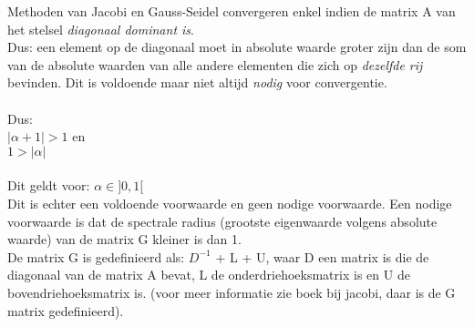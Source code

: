 Methoden van Jacobi en Gauss-Seidel convergeren enkel indien de matrix A van het stelsel \textit{diagonaal dominant is}.\\
Dus: een element op de diagonaal moet in absolute waarde groter zijn dan de som van de absolute waarden van alle andere elementen die zich op \textit{dezelfde rij} bevinden. Dit is voldoende maar niet altijd \textit{nodig} voor convergentie.\\\\
Dus:\\
$|\alpha+1| > 1$ en\\
$1 > |\alpha|$\\\\
Dit geldt voor:
$\alpha \in ]0,1[$\\

Dit is echter een voldoende voorwaarde en geen nodige voorwaarde.
Een nodige voorwaarde is dat de spectrale radius
(grootste eigenwaarde volgens absolute waarde) van de matrix G kleiner is dan 1.\\
De matrix G is gedefinieerd als: $D^{-1}$ + L + U, waar D een matrix is die de diagonaal van de matrix A bevat, L de onderdriehoeksmatrix is en U de bovendriehoeksmatrix is. (voor meer informatie zie boek bij jacobi, daar is de G matrix gedefinieerd).
